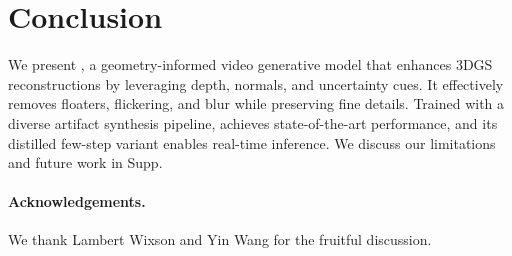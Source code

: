 \section{Conclusion}
We present \ours, a geometry-informed video generative model that enhances 3DGS reconstructions by leveraging depth, normals, and uncertainty cues.
It effectively removes floaters, flickering, and blur while preserving fine details.
Trained with a diverse artifact synthesis pipeline, \ours achieves state-of-the-art performance, and its distilled few-step variant enables real-time inference.
We discuss our limitations and future work in Supp.



\paragraph{Acknowledgements.}
We thank Lambert Wixson and Yin Wang for the fruitful discussion.